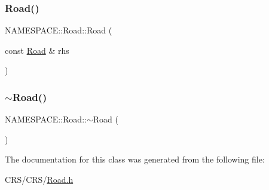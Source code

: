 \subsubsection{\texorpdfstring{Road()}{Road()}\hspace{0.1cm}{\footnotesize\ttfamily [2/2]}}
{\footnotesize\ttfamily N\+A\+M\+E\+S\+P\+A\+C\+E\+::\+Road\+::\+Road (\begin{DoxyParamCaption}\item[{const \hyperlink{class_n_a_m_e_s_p_a_c_e_1_1_road}{Road} \&}]{rhs }\end{DoxyParamCaption})}

\mbox{\label{class_n_a_m_e_s_p_a_c_e_1_1_road_ab0c065a99eaa852463428b1744becffc}} 
\subsubsection{\texorpdfstring{$\sim$\+Road()}{~Road()}}
{\footnotesize\ttfamily N\+A\+M\+E\+S\+P\+A\+C\+E\+::\+Road\+::$\sim$\+Road (\begin{DoxyParamCaption}{ }\end{DoxyParamCaption})}



The documentation for this class was generated from the following file\+:\begin{DoxyCompactItemize}
\item 
C\+R\+S/\+C\+R\+S/\hyperlink{_road_8h}{Road.\+h}\end{DoxyCompactItemize}
